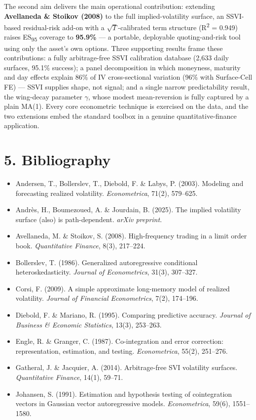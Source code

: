 \documentclass[10pt,a4paper]{article}
\begin{document}
The second aim delivers the main operational contribution: extending \textbf{Avellaneda \& Stoikov (2008)} to the full implied-volatility surface, an SSVI-based residual-risk add-on with a $\sqrt{T}$-calibrated term structure (R\textsuperscript{2} = 0.949) raises ES\textsubscript{95} coverage to \textbf{95.9\%} --- a portable, deployable quoting-and-risk tool using only the asset's own options. Three supporting results frame these contributions: a fully arbitrage-free SSVI calibration database (2,633 daily surfaces, 95.1\% success); a panel decomposition in which moneyness, maturity and day effects explain 86\% of IV cross-sectional variation (96\% with Surface-Cell FE) --- SSVI supplies shape, not signal; and a single narrow predictability result, the wing-decay parameter $\gamma$, whose modest mean-reversion is fully captured by a plain MA(1). Every core econometric technique is exercised on the data, and the two extensions embed the standard toolbox in a genuine quantitative-finance application.

\section*{5. Bibliography}

\begin{itemize}\setlength{\itemsep}{1pt}
\item Andersen, T., Bollerslev, T., Diebold, F. \& Labys, P. (2003). Modeling and forecasting realized volatility. \textit{Econometrica}, 71(2), 579--625.
\item Andr\`{e}s, H., Boumezoued, A. \& Jourdain, B. (2025). The implied volatility surface (also) is path-dependent. \textit{arXiv preprint}.
\item Avellaneda, M. \& Stoikov, S. (2008). High-frequency trading in a limit order book. \textit{Quantitative Finance}, 8(3), 217--224.
\item Bollerslev, T. (1986). Generalized autoregressive conditional heteroskedasticity. \textit{Journal of Econometrics}, 31(3), 307--327.
\item Corsi, F. (2009). A simple approximate long-memory model of realized volatility. \textit{Journal of Financial Econometrics}, 7(2), 174--196.
\item Diebold, F. \& Mariano, R. (1995). Comparing predictive accuracy. \textit{Journal of Business \& Economic Statistics}, 13(3), 253--263.
\item Engle, R. \& Granger, C. (1987). Co-integration and error correction: representation, estimation, and testing. \textit{Econometrica}, 55(2), 251--276.
\item Gatheral, J. \& Jacquier, A. (2014). Arbitrage-free SVI volatility surfaces. \textit{Quantitative Finance}, 14(1), 59--71.
\item Johansen, S. (1991). Estimation and hypothesis testing of cointegration vectors in Gaussian vector autoregressive models. \textit{Econometrica}, 59(6), 1551--1580.
\end{itemize}
\end{document}
